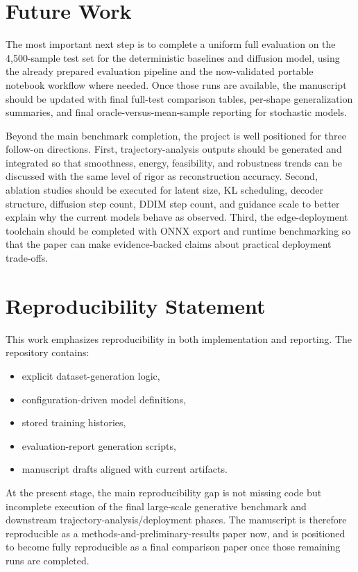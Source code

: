 \documentclass[11pt]{article}
\begin{document}
\section{Future Work}

The most important next step is to complete a uniform full evaluation on the 4,500-sample test set for the deterministic baselines and diffusion model, using the already prepared evaluation pipeline and the now-validated portable notebook workflow where needed. Once those runs are available, the manuscript should be updated with final full-test comparison tables, per-shape generalization summaries, and final oracle-versus-mean-sample reporting for stochastic models.

Beyond the main benchmark completion, the project is well positioned for three follow-on directions. First, trajectory-analysis outputs should be generated and integrated so that smoothness, energy, feasibility, and robustness trends can be discussed with the same level of rigor as reconstruction accuracy. Second, ablation studies should be executed for latent size, KL scheduling, decoder structure, diffusion step count, DDIM step count, and guidance scale to better explain why the current models behave as observed. Third, the edge-deployment toolchain should be completed with ONNX export and runtime benchmarking so that the paper can make evidence-backed claims about practical deployment trade-offs.

\section{Reproducibility Statement}

This work emphasizes reproducibility in both implementation and reporting. The repository contains:
\begin{itemize}[leftmargin=1.5em]
    \item explicit dataset-generation logic,
    \item configuration-driven model definitions,
    \item stored training histories,
    \item evaluation-report generation scripts,
    \item manuscript drafts aligned with current artifacts.
\end{itemize}

At the present stage, the main reproducibility gap is not missing code but incomplete execution of the final large-scale generative benchmark and downstream trajectory-analysis/deployment phases. The manuscript is therefore reproducible as a methods-and-preliminary-results paper now, and is positioned to become fully reproducible as a final comparison paper once those remaining runs are completed.
\end{document}
